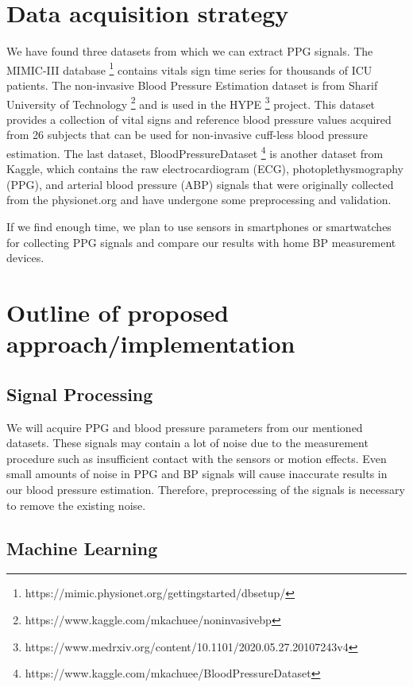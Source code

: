 \documentclass[12pt]{extarticle}
\begin{document}
\section*{Data acquisition strategy}

We have found three datasets from which we can extract PPG signals. The MIMIC-III database \footnote{https://mimic.physionet.org/gettingstarted/dbsetup/} contains vitals sign time series for thousands of ICU patients. The non-invasive Blood Pressure Estimation dataset is from Sharif University of Technology \footnote{https://www.kaggle.com/mkachuee/noninvasivebp} and is used in the HYPE \footnote{https://www.medrxiv.org/content/10.1101/2020.05.27.20107243v4} project. This dataset provides a collection of vital signs and reference blood pressure values acquired from 26 subjects that can be used for non-invasive cuff-less blood pressure estimation.
The last dataset, BloodPressureDataset \footnote{https://www.kaggle.com/mkachuee/BloodPressureDataset} is another dataset from Kaggle, which contains the raw electrocardiogram (ECG), photoplethysmography (PPG), and arterial blood pressure (ABP) signals that were originally collected from the physionet.org and have undergone some preprocessing and validation.\\
\vspace{-5pt}

	If we find enough time, we plan to use sensors in smartphones or smartwatches for collecting PPG signals and compare our results with home BP measurement devices.

\section*{Outline of proposed approach/implementation}

\subsection*{Signal Processing}

We will acquire PPG and blood pressure parameters from our mentioned datasets.     These signals may contain a lot of noise due to the measurement procedure such as insufficient contact with the sensors or motion effects. Even small amounts of noise in PPG and BP signals will cause inaccurate results in our blood pressure estimation. Therefore, preprocessing of the signals is necessary to remove the existing noise.

\subsection*{Machine Learning}
\end{document}
